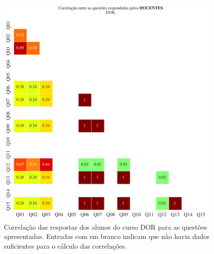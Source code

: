 \documentclass[a4paper,10pt]{article}
\begin{document}
\begin{figure}[h]
\centering
\includegraphics[width=0.999\linewidth]{matriz_corr__DOR_docentes.png}
\caption{\label{fig:corr_docentes}Correlação das respostas dos alunos do curso DOR para as questões apresentadas. Entradas com em branco indicam que não havia dados suficientes para o cálculo das correlações.}
\end{figure}
\end{document}
